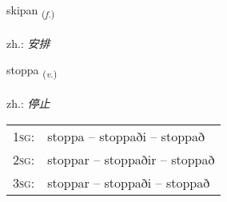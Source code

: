 \documentclass[frontgrid, backgrid]{flacards}\usepackage[]{graphicx}\usepackage[]{xcolor}
\begin{document}
\renewcommand{\flhead}{\vskip5pt \fboxsep=0pt {\small\bfseries\footnotesize Nafnorð | 名词}}
\renewcommand{\fcfoot}{\vskip5pt \fboxsep=0pt \hspace{2pt}{\small\bfseries\footnotesize 3K}}

\renewcommand{\blhead}{\vskip5pt {\small\bfseries\footnotesize Nafnorð | 名词 }}
\renewcommand{\bcfoot}{\vskip5pt \hspace{2pt}{\small\bfseries\footnotesize 3K}}


{skipan \small{\textsubscript{(\textit{f.})}} \\[1ex] %
\textphonetic{[scɪːpan]} \\
zh.: \emph{安排} \\  [2ex]
\renewcommand*{\arraystretch}{0.8}
}

\renewcommand{\flhead}{\vskip5pt \fboxsep=0pt {\small\bfseries\footnotesize Sagnorð | 动词}}
\renewcommand{\fcfoot}{\vskip5pt \fboxsep=0pt \hspace{2pt}{\small\bfseries\footnotesize 3K}}

\renewcommand{\blhead}{\vskip5pt {\small\bfseries\footnotesize Sagnorð | 动词 }}
\renewcommand{\bcfoot}{\vskip5pt \hspace{2pt}{\small\bfseries\footnotesize 3K}}


{stoppa \small{\textsubscript{(\textit{v.})}} \\[1ex] %
\textphonetic{[stɔhpa]} \\
zh.: \emph{停止} \\  [2ex]
\renewcommand*{\arraystretch}{0.8}
\begin{tabular}{p{1cm}l}
\textsc{1sg}: & stoppa -- stoppaði -- stoppað \\ 
\textsc{2sg}: & stoppar -- stoppaðir -- stoppað \\ 
\textsc{3sg}: & stoppar -- stoppaði -- stoppað \\ 
\end{tabular}
}
\end{document}
